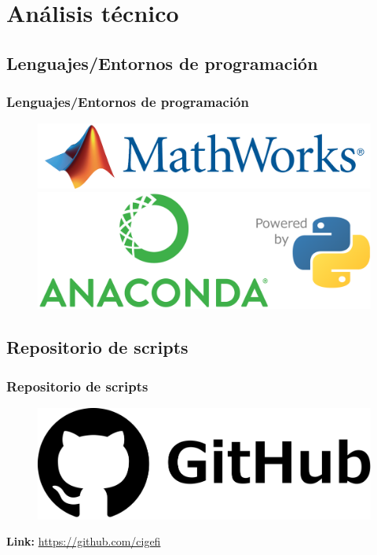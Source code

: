 \documentclass{beamer}
\newtheorem{Th1}{Reseña Historica}
\begin{document}

	\section{Análisis técnico}
	\subsection{Lenguajes/Entornos de programación}
	\begin{frame}
		\frametitle{Lenguajes/Entornos de programación}
		\begin{figure}[!hbt]
		   \centering
		   \includegraphics[width=3.65 in]{mathworks.png}\\
		   \includegraphics[scale=0.4]{anaconda-python.png}
		\end{figure}
	\end{frame} 

	\subsection{Repositorio de scripts}
	\begin{frame}
		\frametitle{Repositorio de scripts}
		\begin{figure}[!hbt]
		   \centering
		   \includegraphics[width=4 in]{github.png}
		\end{figure}
		\textbf{Link: }\href{https://github.com/cigefi}{https://github.com/cigefi}
	\end{frame}
\end{document}
